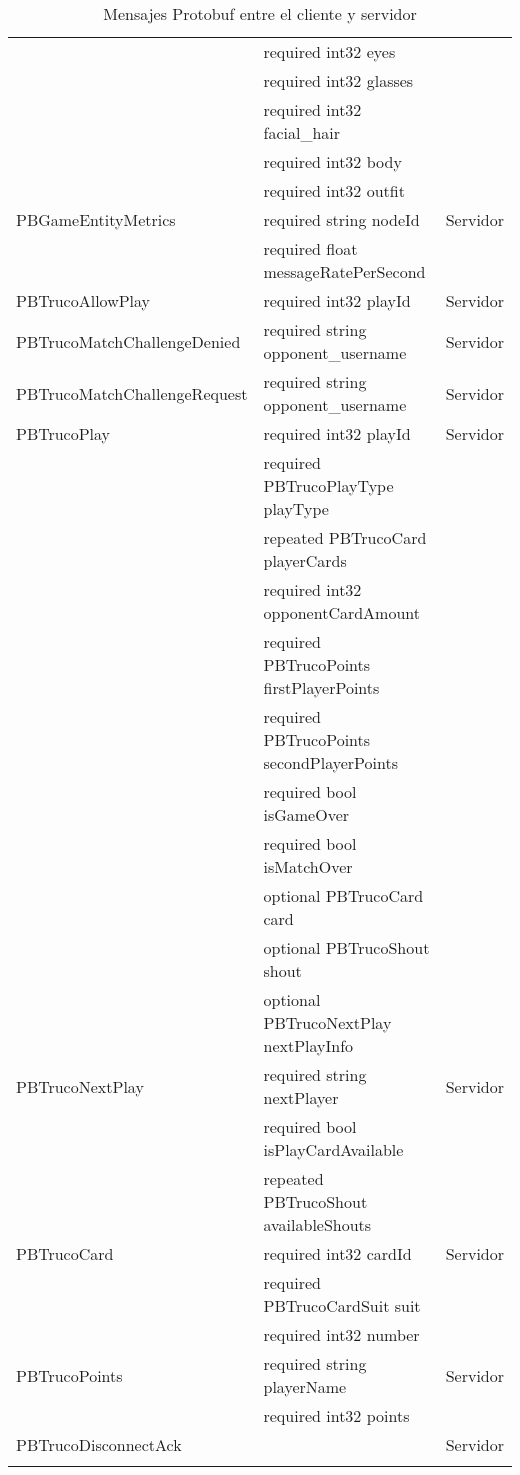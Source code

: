 \begin{longtable}{|p{}|p{}|p{}|}
                            & required int32 eyes & \\
                            & required int32 glasses & \\
                            & required int32 facial\_hair & \\
                            & required int32 body & \\
                            & required int32 outfit & \\
    \hline
    PBGameEntityMetrics & required string nodeId & Servidor \\
                        & required float messageRatePerSecond & \\
    \hline
    PBTrucoAllowPlay & required int32 playId & Servidor \\
    \hline
    PBTrucoMatchChallengeDenied & required string opponent\_username & Servidor \\
    \hline
    PBTrucoMatchChallengeRequest & required string opponent\_username & Servidor \\
    \hline
    PBTrucoPlay & required int32 playId & Servidor \\
                & required PBTrucoPlayType playType & \\
                & repeated PBTrucoCard playerCards & \\
                & required int32 opponentCardAmount & \\
                & required PBTrucoPoints firstPlayerPoints & \\
                & required PBTrucoPoints secondPlayerPoints & \\
                & required bool isGameOver & \\
                & required bool isMatchOver & \\
                & optional PBTrucoCard card & \\
                & optional PBTrucoShout shout & \\
                & optional PBTrucoNextPlay nextPlayInfo & \\
    \hline
    PBTrucoNextPlay & required string nextPlayer & Servidor \\
                    & required bool isPlayCardAvailable & \\
                    & repeated PBTrucoShout availableShouts & \\
    \hline
    PBTrucoCard & required int32 cardId & Servidor \\
                & required PBTrucoCardSuit suit & \\
                & required int32 number & \\
    \hline
    PBTrucoPoints & required string playerName & Servidor \\
                    & required int32 points & \\
    \hline
    PBTrucoDisconnectAck &  & Servidor \\
    \hline
\caption{Mensajes Protobuf entre el cliente y servidor} \\
\end{longtable}

